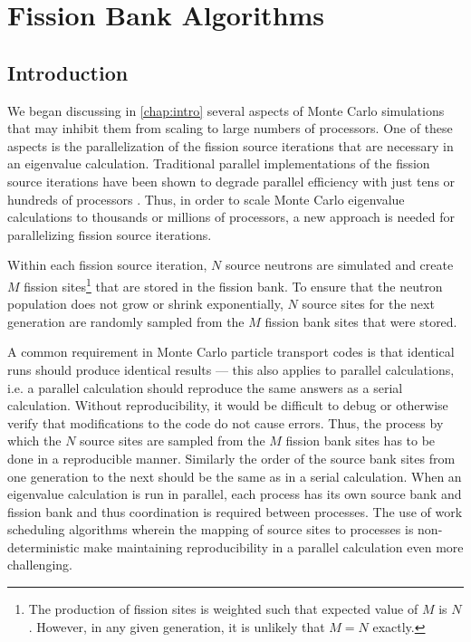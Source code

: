 \chapter{Fission Bank Algorithms}
\label{chap:fission-bank}

\section{Introduction}

We began discussing in \autoref{chap:intro} several aspects of Monte Carlo
simulations that may inhibit them from scaling to large numbers of
processors. One of these aspects is the parallelization of the fission source
iterations that are necessary in an eigenvalue calculation. Traditional parallel
implementations of the fission source iterations have been shown to degrade
parallel efficiency with just tens or hundreds of processors
\cite{physor-hoogenboom-2012}. Thus, in order to scale Monte Carlo eigenvalue
calculations to thousands or millions of processors, a new approach is needed
for parallelizing fission source iterations.

Within each fission source iteration, $N$ source neutrons are simulated and
create $M$ fission sites\footnote{The production of fission sites is weighted
  such that expected value of $M$ is $N$. However, in any given generation, it
  is unlikely that $M=N$ exactly.} that are stored in the fission bank. To
ensure that the neutron population does not grow or shrink exponentially, $N$
source sites for the next generation are randomly sampled from the $M$ fission
bank sites that were stored.

A common requirement in Monte Carlo particle transport codes is that identical
runs should produce identical results --- this also applies to parallel
calculations, i.e. a parallel calculation should reproduce the same answers as a
serial calculation. Without reproducibility, it would be difficult to debug or
otherwise verify that modifications to the code do not cause errors. Thus, the
process by which the $N$ source sites are sampled from the $M$ fission bank
sites has to be done in a reproducible manner. Similarly the order of the source
bank sites from one generation to the next should be the same as in a serial
calculation. When an eigenvalue calculation is run in parallel, each process has
its own source bank and fission bank and thus coordination is required between
processes. The use of work scheduling algorithms wherein the mapping of source
sites to processes is non-deterministic make maintaining reproducibility in a
parallel calculation even more challenging.

